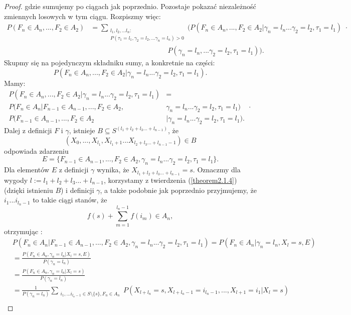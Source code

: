 \documentclass[a4paper]{article}
\theoremstyle{defn}
\theoremstyle{theorem}
\theoremstyle{lemma}
\theoremstyle{cor}
\theoremstyle{fact}
\begin{document}
\begin{proof}
gdzie sumujemy po ciągach jak poprzednio.
Pozostaje pokazać niezależność zmiennych losowych w tym ciągu. Rozpiszmy więc:
\begin{align*}
    P(F_n \in A_n, ..., F_2 \in A_2) &= \sum\limits_{\substack{l_1, l_2, ... l_n:\\P(\tau_1 = l_1, \gamma_2 = l_2, ... \gamma_n = l_n) > 0}}(P(F_n \in A_n, ..., F_2 \in A_2|\gamma_n = l_n ... \gamma_2 = l_2, \tau_1 = l_1)\,\, \cdot \\
    &\quad\quad\quad\quad\quad\quad\quad\quad\quad\quad\quad P(\gamma_n = l_n, ... \gamma_2 = l_2, \tau_1 = l_1)).
\end{align*}
Skupmy się na pojedynczym składniku sumy, a konkretnie na części:
$$P(F_n \in A_n, ..., F_2 \in A_2|\gamma_n = l_n ... \gamma_2 = l_2, \tau_1 = l_1).$$
Mamy:
\begin{align*}
    P(F_n \in A_n, ..., F_2 \in A_2 |\gamma_n = l_n ... \gamma_2 = l_2, \tau_1 = l_1) &=\\
    P(F_n \in A_n|F_{n-1} \in A_{n-1},  ..., F_2 \in A_2, &\gamma_n = l_n ... \gamma_2 = l_2, \tau_1 = l_1)\quad \cdot \\
    P(F_{n-1} \in A_{n-1},  ..., F_2 \in A_2 &|\gamma_n = l_n ... \gamma_2 = l_2, \tau_1 = l_1).
\end{align*}
Dalej z definicji $F$ i $\gamma$, istnieje $B \subseteq S^{(l_1 + l_2 + l_3 ... +l_{n-1})}$, że $$(X_0, ..., X_{l_1}, X_{l_1+1} ... X_{l_2 + l_3 ... + l_{n-1} - 1}) \in B$$
odpowiada zdarzeniu
$$E = \{F_{n-1} \in A_{n-1},  ..., F_2 \in A_2, \gamma_n = l_n ... \gamma_2 = l_2, \tau_1 = l_1\}.$$
Dla elementów $E$ z definicji $\gamma$ wynika, że $X_{l_1 + l_2 + l_3 ... + l_{n-1}} = s$. Oznaczmy dla wygody $l := l_1 + l_2 + l_3 ... + l_{n-1}$, korzystamy z twierdzenia (\ref{theorem2.1.4}) (dzięki istnieniu $B$) i definicji $\gamma$, a także podobnie jak poprzednio przyjmujemy, że $i_1 ... i_{l_n-1}$ to takie ciągi stanów, że $$f(s) + \sum\limits_{m = 1}^{l_n-1} f(i_m) \in A_n,$$
otrzymując :
\begin{align*}
    &P(F_n \in A_n|F_{n-1} \in A_{n-1},  ..., F_2 \in A_2, \gamma_n = l_n ... \gamma_2 = l_2, \tau_1 = l_1) = P(F_n \in A_n|\gamma_n = l_n, X_l = s, E)
\end{align*}
\begin{align*}
    &= \frac{P(F_n \in A_n, \gamma_n = l_n | X_l = s, E)}{P(\gamma_n = l_n)}\\
    &= \frac{P(F_n \in A_n, \gamma_n = l_n | X_l = s)}{P(\gamma_n = l_n)}\\
    &= \frac{1}{P(\gamma_n = l_n)} \sum\limits_{\substack{i_1, ... i_{l_n - 1} \in S\setminus \{s\}, F_n \in A_n}} P(X_{l+l_n} = s, X_{l+l_{n}-1} = i_{l_{n}-1}, ..., X_{l+1} = i_1 | X_l = s)\\

\end{align*}
\end{proof}
\end{document}

